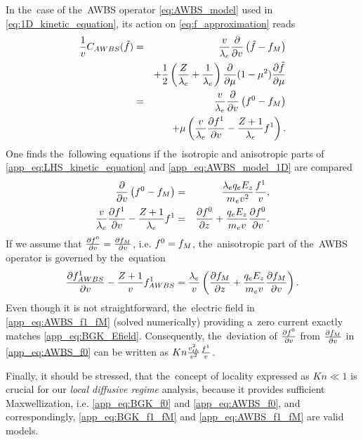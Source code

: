 In the~case of the~AWBS operator \eqref{eq:AWBS_model} used in 
\eqref{eq:1D_kinetic_equation}, its action on \eqref{eq:f_approximation} reads
\begin{eqnarray}
  \frac{1}{v}C_{AWBS}(\tilde{f})
  &=& 
  \frac{v}{\lambda_e} \frac{\partial{}}{\partial{v}}\left(\tilde{f} - f_M\right) \nonumber \\
  && + \frac{1}{2}\left(\frac{Z}{\lambda_e} + \frac{1}{\lambda_e}\right)
  \frac{\partial{}}{\partial{\mu}}(1 - \mu^2)\frac{\partial{\tilde{f}}}{\partial{\mu}}  \nonumber \\
  &=& \frac{v}{\lambda_e} \frac{\partial{}}{\partial{v}}\left(f^0 - f_M\right) \nonumber \\ 
  &&\, + \mu\left(\frac{v}{\lambda_e} \frac{\partial{f^1}}{\partial{v}} 
  - \frac{Z+1}{\lambda_e}f^1\right) .
  \label{app_eq:AWBS_model_1D}
\end{eqnarray}
One finds the~following equations if the~isotropic and anisotropic parts of 
\eqref{app_eq:LHS_kinetic_equation} and \eqref{app_eq:AWBS_model_1D} are 
compared 
\begin{eqnarray}
  \frac{\partial{}}{\partial{v}}\left( f^0 -f_M\right) &=& 
  \frac{\lambda_eq_eE_z}{m_ev^2}\frac{f^1}{v} ,
  \label{app_eq:AWBS_f0} \\
  \frac{v}{\lambda_e} \frac{\partial{f^1}}{\partial{v}} 
  - \frac{Z+1}{\lambda_e}f^1 &=&
  \frac{\partial{f^0}}{\partial{z}} + \frac{q_eE_z}{m_ev}\frac{\partial{f^0}}{\partial{v}} .
  \label{app_eq:AWBS_f1} 
\end{eqnarray}
If we assume that $\frac{\partial{f^0}}{\partial{v}} = \frac{\partial{f_M}}{\partial{v}}$, i.e. $f^0 = f_M$,
the~anisotropic part of the~AWBS operator is governed by the~equation
\begin{equation}
  \frac{\partial{f^1_{AWBS}}}{\partial{v}} 
  - \frac{Z+1}{v}f^1_{AWBS} =
  \frac{\lambda_e}{v} 
  \left(\frac{\partial{f_M}}{\partial{z}} + \frac{q_eE_z}{m_ev}\frac{\partial{f_M}}{\partial{v}}\right) .
  \label{app_eq:AWBS_f1_fM}
\end{equation}
Even though it is not straightforward, the~electric field in 
\eqref{app_eq:AWBS_f1_fM} (solved numerically) providing a~zero current 
exactly matches \eqref{app_eq:BGK_Efield}. Consequently, the~deviation of
$\frac{\partial{f^0}}{\partial{v}}$ from $\frac{\partial{f_M}}{\partial{v}}$ in 
\eqref{app_eq:AWBS_f0} can be written as 
$Kn\frac{v_{th}^2}{v^2}\frac{f^1}{v}$.

Finally, it should be stressed, that the~concept of locality expressed as 
$Kn\ll1$ is crucial for our \textit{local diffusive regime} analysis, 
because it provides sufficient Maxwellization, i.e.  \eqref{app_eq:BGK_f0} and
\eqref{app_eq:AWBS_f0}, and correspondingly, \eqref{app_eq:BGK_f1_fM} 
and \eqref{app_eq:AWBS_f1_fM} are valid models.

